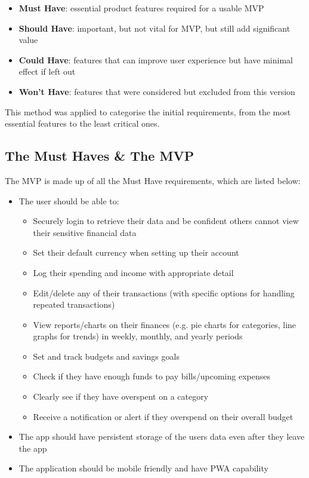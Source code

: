\documentclass{l4proj}
\begin{document}
\begin{itemize}
    \item \textbf{Must Have}: essential product features required for a usable MVP
    \item \textbf{Should Have}: important, but not vital for MVP, but still add significant value
    \item \textbf{Could Have}: features that can improve user experience but have minimal effect if left out
    \item \textbf{Won’t Have}: features that were considered but excluded from this version
\end{itemize}

This method was applied to categorise the initial requirements, from the most essential features to the least critical ones.



\subsection{The Must Haves \& The MVP}

The MVP is made up of all the Must Have requirements, which are listed below:

\begin{itemize}
    \item The user should be able to:
    \begin{itemize}
        \item Securely login to retrieve their data and be confident others cannot view their sensitive financial data
        \item Set their default currency when setting up their account
        \item Log their spending and income with appropriate detail
        \item Edit/delete any of their transactions (with specific options for handling repeated transactions)
        \item View reports/charts on their finances (e.g. pie charts for categories, line graphs for trends) in weekly, monthly, and yearly periods
        \item Set and track budgets and savings goals
        \item Check if they have enough funds to pay bills/upcoming expenses
        \item Clearly see if they have overspent on a category
        \item Receive a notification or alert if they overspend on their overall budget
    \end{itemize}
    \item The app should have persistent storage of the users data even after they leave the app
    \item The application should be mobile friendly and have PWA capability
\end{itemize}
\end{document}
